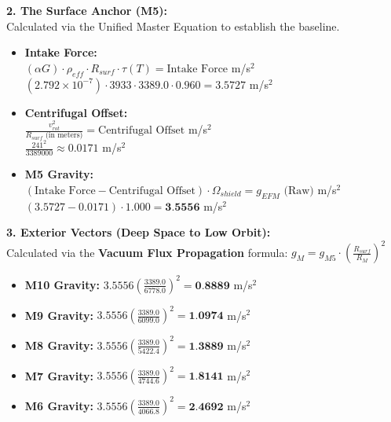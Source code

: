 \documentclass[11pt, a4paper]{article}
\begin{document}
  \vspace{1.0em}
  \noindent \textbf{2. The Surface Anchor (M5):} \\
  \hspace*{1em} Calculated via the Unified Master Equation to establish the baseline.
  \begin{itemize}
    \item \textbf{Intake Force:} \\[0.5em]
    \hspace*{2em} $(\alpha G) \cdot \rho_{eff} \cdot R_{surf} \cdot \tau(T) = \text{Intake Force}$ m/s$^2$ \\[1em]
    \hspace*{2em} $(2.792 \times 10^{-7}) \cdot 3933 \cdot 3389.0 \cdot 0.960 = 3.5727$ m/s$^2$
    
    \item \textbf{Centrifugal Offset:} \\[0.5em]
    \hspace*{2em} $\frac{v_{rot}^2}{R_{surf} \text{ (in meters)}} = \text{Centrifugal Offset}$ m/s$^2$ \\[1em]
    \hspace*{2em} $\frac{241^2}{3389000} \approx 0.0171$ m/s$^2$
    
    \item \textbf{M5 Gravity:} \\[0.5em]
    \hspace*{2em} $(\text{Intake Force} - \text{Centrifugal Offset}) \cdot \Omega_{shield} = g_{EFM} \text{ (Raw)}$ m/s$^2$ \\[1em]
    \hspace*{2em} $(3.5727 - 0.0171) \cdot 1.000 = \textbf{3.5556}$ m/s$^2$
  \end{itemize}

  \clearpage
  \noindent \textbf{3. Exterior Vectors (Deep Space to Low Orbit):} \\
  \hspace*{1em} Calculated via the \textbf{Vacuum Flux Propagation} formula: $g_M = g_{M5} \cdot \left( \frac{R_{surf}}{R_M} \right)^2$
  \begin{itemize}
    \item \textbf{M10 Gravity:} $3.5556 \left( \frac{3389.0}{6778.0} \right)^2 = \textbf{0.8889}$ m/s$^2$
    \item \textbf{M9 Gravity:} $3.5556 \left( \frac{3389.0}{6099.0} \right)^2 = \textbf{1.0974}$ m/s$^2$
    \item \textbf{M8 Gravity:} $3.5556 \left( \frac{3389.0}{5422.4} \right)^2 = \textbf{1.3889}$ m/s$^2$
    \item \textbf{M7 Gravity:} $3.5556 \left( \frac{3389.0}{4744.6} \right)^2 = \textbf{1.8141}$ m/s$^2$
    \item \textbf{M6 Gravity:} $3.5556 \left( \frac{3389.0}{4066.8} \right)^2 = \textbf{2.4692}$ m/s$^2$
  \end{itemize}
\end{document}
